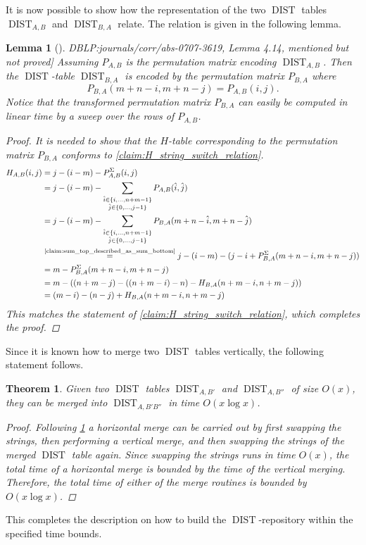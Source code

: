 \documentclass[twoside,11pt,openright]{report}
\newcommand{\DIST}{\operatorname{DIST}}
\newcommand{\refbook}[2]{\cite[#1]{DBLP:journals/corr/abs-0707-3619}, #2}
\newtheorem{lemma}{Lemma}
\newtheorem{theorem}{Theorem}
\begin{document}
%
It is now possible to show how the representation of the two $\DIST$ tables $\DIST_{A,B}$ and $\DIST_{B,A}$ relate. The relation is given in the following lemma.
%
\begin{lemma}[\refbook{p.-52}{Lemma 4.14, mentioned but not proved}]
  \label{lemma:swap_strings}
  Assuming $P_{A,B}$ is the permutation matrix encoding $\DIST_{A,B}$. Then the $\DIST$-table $\DIST_{B,A}$ is encoded by the permutation matrix $P_{B,A}$ where
  \[
    P_{B,A}(m + n - i, m + n - j) = P_{A,B}(i, j).
  \]
  Notice that the transformed permutation matrix $P_{B,A}$ can easily be computed in linear time by a sweep over the rows of $P_{A,B}$.
  \begin{proof}
    It is needed to show that the $H$-table corresponding to the permutation matrix $P_{B,A}$ conforms to \cref{claim:H_string_switch_relation}.
    \begin{align*}
      H_{A,B}(i, j) &= j - (i - m) - P_{A,B}^{\Sigma}(i, j) \\
        &= j - (i - m) - \sum_{\substack{ \hat{i} \in \{i,\dots,n+m - 1\} \\ \hat{j} \in \{0, \dots, j - 1\}}} P_{A,B}(\hat{i}, \hat{j}) \\
        &= j - (i - m) - \sum_{\substack{ \hat{i} \in \{i, \dots, n + m - 1\} \\ \hat{j} \in \{ 0, \dots, j - 1 \}}} P_{B,A}(m + n - \hat{i}, m + n - \hat{j}) \\
        &\overset{\text{\cref{claim:sum_top_described_as_sum_bottom}}}{=} j - (i - m) - (j - i + P_{B,A}^{\Sigma}(m + n - i, m + n - j)) \\
        &= m - P_{B,A}^{\Sigma}(m + n - i, m + n - j) \\
        &= m - \left( (n + m - j) - ((n + m - i) - n) - H_{B,A}(n + m - i, n + m - j) \right) \\
        &= (m - i) - (n - j) + H_{B,A}(n + m - i, n + m - j)
    \end{align*}
    This matches the statement of \cref{claim:H_string_switch_relation}, which completes the proof.
  \end{proof}
\end{lemma}
%
Since it is known how to merge two $\DIST$ tables vertically, the following statement follows.
\begin{theorem}
  \label{thm:dist-horizontal-merge}
  Given two $\DIST$ tables $\DIST_{A,B'}$ and $\DIST_{A,B''}$ of size $O(x)$, they can be merged into $\DIST_{A,B'B''}$ in time $O(x\log{x})$.
  \begin{proof}
    Following \cref{lemma:swap_strings} a horizontal merge can be carried out by first swapping the strings, then performing a vertical merge, and then swapping the strings of the merged $\DIST$ table again. Since swapping the strings runs in time $O(x)$, the total time of a horizontal merge is bounded by the time of the vertical merging. Therefore, the total time of either of the merge routines is bounded by $O(x\log{x})$.
  \end{proof}
\end{theorem}
This completes the description on how to build the $\DIST$-repository within the specified time bounds.
\end{document}
